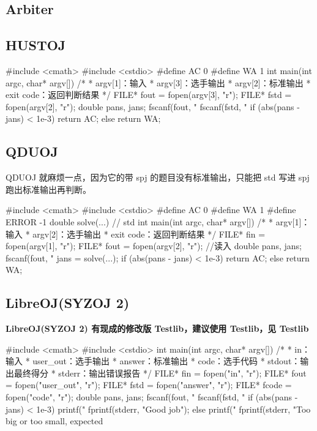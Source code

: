 \subsection{Arbiter}

\subsection{HUSTOJ}

\begin{cppcode}
#include <cmath>
#include <cstdio>
#define AC 0
#define WA 1
int main(int argc, char* argv[]) {
  /*
   * argv[1]：输入
   * argv[3]：选手输出
   * argv[2]：标准输出
   * exit code：返回判断结果
   */
  FILE* fout = fopen(argv[3], "r");
  FILE* fstd = fopen(argv[2], "r");
  double pans, jans;
  fscanf(fout, "%
  fscanf(fstd, "%
  if (abs(pans - jans) < 1e-3)
    return AC;
  else
    return WA;
}
\end{cppcode}

\subsection{QDUOJ}

QDUOJ 就麻烦一点，因为它的带 spj 的题目没有标准输出，只能把 std 写进 spj 跑出标准输出再判断。

\begin{cppcode}
#include <cmath>
#include <cstdio>
#define AC 0
#define WA 1
#define ERROR -1
double solve(...) {
  // std
}
int main(int argc, char* argv[]) {
  /*
   * argv[1]：输入
   * argv[2]：选手输出
   * exit code：返回判断结果
   */
  FILE* fin = fopen(argv[1], "r");
  FILE* fout = fopen(argv[2], "r");
  //读入
  double pans, jans;
  fscanf(fout, "%
  jans = solve(...);
  if (abs(pans - jans) < 1e-3)
    return AC;
  else
    return WA;
}
\end{cppcode}

\subsection{LibreOJ(SYZOJ 2)}

\textbf{LibreOJ(SYZOJ 2) 有现成的修改版 Testlib，建议使用 Testlib，见  Testlib }

\begin{cppcode}
#include <cmath>
#include <cstdio>
int main(int argc, char* argv[]) {
  /*
   * in：输入
   * user_out：选手输出
   * answer：标准输出
   * code：选手代码
   * stdout：输出最终得分
   * stderr：输出错误报告
   */
  FILE* fin = fopen("in", "r");
  FILE* fout = fopen("user_out", "r");
  FILE* fstd = fopen("answer", "r");
  FILE* fcode = fopen("code", "r");
  double pans, jans;
  fscanf(fout, "%
  fscanf(fstd, "%
  if (abs(pans - jans) < 1e-3) {
    printf("%
    fprintf(stderr, "Good job");
  } else {
    printf("%
    fprintf(stderr, "Too big or too small, expected %
  }
}
\end{cppcode}
